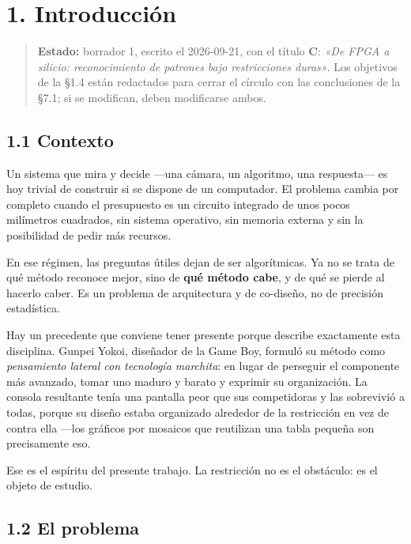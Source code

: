 \newpage

\chapter{1. Introducción}\label{introducciuxf3n}

\begin{quote}
\textbf{Estado:} borrador 1, escrito el 2026-09-21, con el título
\textbf{C}: \emph{«De FPGA a silicio: reconocimiento de patrones bajo
restricciones duras»}. Los objetivos de la §1.4 están redactados para
cerrar el círculo con las conclusiones de la §7.1; si se modifican,
deben modificarse ambos.
\end{quote}

\section{1.1 Contexto}\label{contexto}

Un sistema que mira y decide ---una cámara, un algoritmo, una
respuesta--- es hoy trivial de construir si se dispone de un computador.
El problema cambia por completo cuando el presupuesto es un circuito
integrado de unos pocos milímetros cuadrados, sin sistema operativo, sin
memoria externa y sin la posibilidad de pedir más recursos.

En ese régimen, las preguntas útiles dejan de ser algorítmicas. Ya no se
trata de qué método reconoce mejor, sino de \textbf{qué método cabe}, y
de qué se pierde al hacerlo caber. Es un problema de arquitectura y de
co-diseño, no de precisión estadística.

Hay un precedente que conviene tener presente porque describe
exactamente esta disciplina. Gunpei Yokoi, diseñador de la Game Boy,
formuló su método como \emph{pensamiento lateral con tecnología
marchita}: en lugar de perseguir el componente más avanzado, tomar uno
maduro y barato y exprimir su organización. La consola resultante tenía
una pantalla peor que sus competidoras y las sobrevivió a todas, porque
su diseño estaba organizado alrededor de la restricción en vez de contra
ella ---los gráficos por mosaicos que reutilizan una tabla pequeña son
precisamente eso.

Ese es el espíritu del presente trabajo. La restricción no es el
obstáculo: es el objeto de estudio.

\section{1.2 El problema}\label{el-problema}

